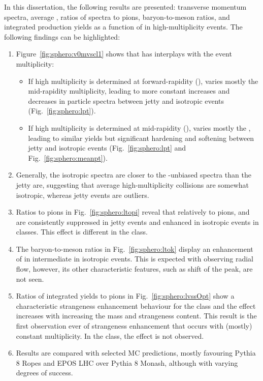 In this dissertation, the following results are presented: transverse momentum \pt spectra, average \meanpt, ratios of \pt spectra to pions, baryon-to-meson ratios, and integrated production yields as a function of \SOPT in high-multiplicity events. The following findings can be highlighted:
\begin{enumerate}
\item Figure~\ref{fig:sphero:v0mvscl1} shows that \SOPT has interplays with the event multiplicity:
\begin{itemize}
\item If high multiplicity is determined at forward-rapidity (\VOM), \SOPT varies mostly the mid-rapidity multiplicity, leading to more constant increases and decreases in particle spectra between jetty and isotropic events (Fig.~\ref{fig:sphero:lpt}). 
\item If high multiplicity is determined at mid-rapidity (\NSPD), \SOPT varies mostly the \meanpt, leading to similar yields but significant hardening and softening between jetty and isotropic events (Fig.~\ref{fig:sphero:lpt} and Fig.~\ref{fig:sphero:meanpt}).
\end{itemize}
\item Generally, the isotropic spectra are closer to the \SOPT-unbiased spectra than the jetty are, suggesting that average high-multiplicity collisions are somewhat isotropic, whereas jetty events are outliers.
\item Ratios to pions in Fig.~\ref{fig:sphero:ltopi} reveal that relatively to pions, \KOs and \LA are consistently suppressed in jetty events and enhanced in isotropic events in \NSPD classes. This effect is different in the \VOM class.
\item The baryon-to-meson ratios \ltok in Fig.~\ref{fig:sphero:ltok} display an enhancement of \LA in intermediate \pt in isotropic events. This is expected with observing radial flow, however, its other characteristic features, such as shift of the peak, are not seen.
\item Ratios of integrated yields to pions in Fig.~\ref{fig:sphero:lvssOpt} show a characteristic strangeness enhancement behaviour for the \NSPD class and the effect increases with increasing the mass and strangeness content. This result is the first observation ever of strangeness enhancement that occurs with (mostly) constant multiplicity. In the \VOM class, the effect is not observed.
\item Results are compared with selected MC predictions, mostly favouring Pythia 8 Ropes and EPOS LHC over Pythia 8 Monash, although with varying degrees of success.
\end{enumerate}

